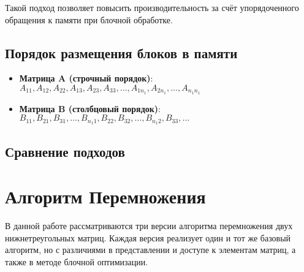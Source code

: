 \documentclass[14pt, russian]{matmex-diploma-custom}
\begin{document}
Такой подход позволяет повысить производительность за счёт упорядоченного обращения к памяти при блочной обработке.

\subsection{Порядок размещения блоков в памяти}

\begin{itemize}
    \item \textbf{Матрица A (строчный порядок)}: $A_{11}, A_{12}, A_{22}, A_{13}, A_{23}, A_{33}, \ldots, A_{1n_1}, A_{2n_1}, \ldots, A_{n_1n_1}$
    \item \textbf{Матрица B (столбцовый порядок)}: $B_{11}, B_{21}, B_{31}, \ldots, B_{n_1 1}, B_{22}, B_{32}, \ldots, B_{n_1 2}, B_{33}, \ldots$
\end{itemize}

\subsection{Сравнение подходов}

\begin{table}[h!]
\centering
{}
\caption{Сравнение способов хранения матриц}
\end{table}


\section{Алгоритм Перемножения}

В данной работе рассматриваются три версии алгоритма перемножения двух нижнетреугольных матриц. Каждая версия реализует один и тот же базовый алгоритм, но с различиями в представлении и доступе к элементам матриц, а также в методе блочной оптимизации.
\end{document}
